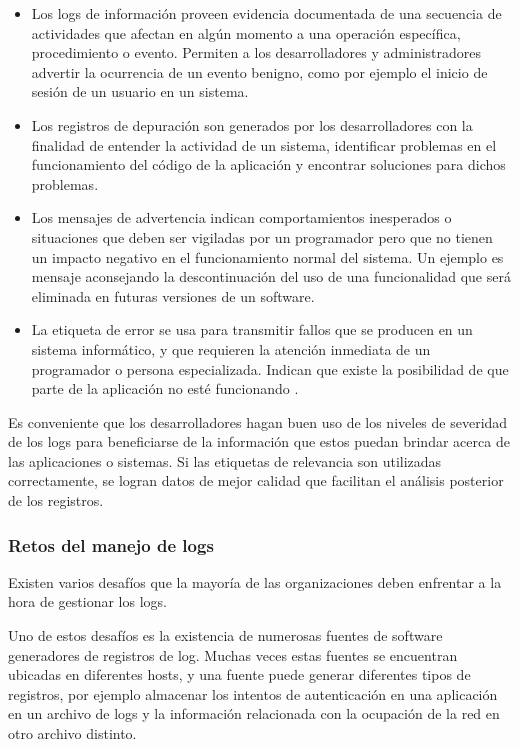 \begin{itemize}
  \item Los logs de información proveen evidencia documentada de una secuencia
  de actividades que afectan en algún momento a una operación específica,
procedimiento o evento. Permiten a los desarrolladores y administradores
advertir la ocurrencia de un evento benigno, como por ejemplo el inicio de
sesión de un usuario en un sistema.  \item Los registros de depuración son
  generados por los desarrolladores con la finalidad de entender la actividad
    de un sistema, identificar problemas en el funcionamiento del código de la
    aplicación y encontrar soluciones para dichos problemas.

  \item Los mensajes de advertencia indican comportamientos inesperados o
    situaciones que deben ser vigiladas por un programador pero que no tienen
    un impacto negativo en el funcionamiento normal del sistema. Un ejemplo es
    mensaje aconsejando la descontinuación del uso de una funcionalidad que
    será eliminada en futuras versiones de un software.

  \item La etiqueta de error se usa para transmitir fallos que se producen en
    un sistema informático, y que requieren la atención inmediata de un
    programador o persona especializada. Indican que existe la posibilidad de
    que parte de la aplicación no esté funcionando
    \cite[p.~3]{monitoreo:logging_and_log_management}.
\end{itemize}

Es conveniente que los desarrolladores hagan buen uso de los niveles de
severidad de los logs para beneficiarse de la información que estos puedan
brindar acerca de las aplicaciones o sistemas. Si las etiquetas de relevancia
son utilizadas correctamente, se logran datos de mejor calidad que facilitan el
análisis posterior de los registros.

\subsubsection*{Retos del manejo de logs}
\label{retos_del_manejo_de_logs}

Existen varios desafíos que la mayoría de las organizaciones deben enfrentar a
la hora de gestionar los logs.

Uno de estos desafíos es la existencia de numerosas fuentes de software
generadores de registros de log. Muchas veces estas fuentes se encuentran
ubicadas en diferentes hosts, y una fuente puede generar diferentes tipos de
registros, por ejemplo almacenar los intentos de autenticación en una
aplicación en un archivo de logs y la información relacionada con la ocupación
de la red en otro archivo distinto.

